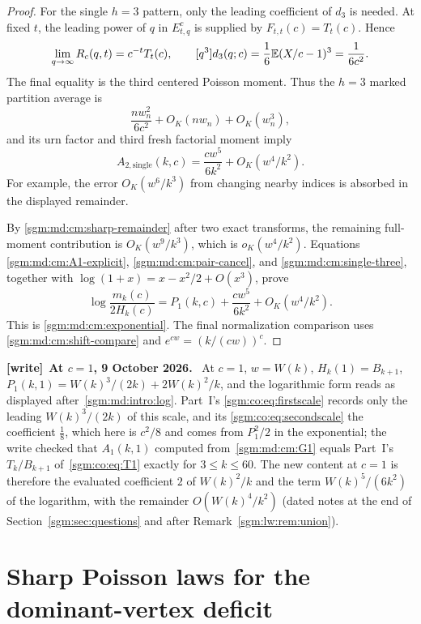 \documentclass[11pt,letterpaper]{article}
\theoremstyle{remark}\newtheorem{remark}[theorem]{Remark}
\newenvironment{writenote}[1][]{\par\smallskip\begingroup\small
 \noindent\textbf{[write]}\if\relax\detokenize{#1}\relax\else~\textbf{#1.}\fi\ }%
 {\par\endgroup\smallskip}
\theoremstyle{definition}\newtheorem{definition}[theorem]{Definition}
\begin{document}
\begin{proof}
For the single \(h=3\) pattern, only the leading coefficient of
\(d_3\) is needed. At fixed \(t\), the leading power of \(q\) in
\(E^c_{t,q}\) is supplied by \(F_{t,t}(c)=T_t(c)\).
Hence
\[
 \lim_{q\to\infty}R_c(q,t)=c^{-t}T_t(c),\qquad
 [q^3]d_3(q;c)
 =\frac16\mathbb E(X/c-1)^3=\frac1{6c^2}.
\]
The final equality is the third centered Poisson moment.
Thus the \(h=3\) marked partition average is
\[
 \frac{nw_n^2}{6c^2}+O_K(nw_n)+O_K(w_n^3),
\]
and its urn factor and third fresh factorial moment imply
\begin{equation}\label{sgm:md:cm:single-three}
 A_{2,\mathrm{single}}(k,c)
 =\frac{cw^5}{6k^2}+O_K(w^4/k^2).
\end{equation}
For example, the error \(O_K(w^6/k^3)\) from changing nearby
indices is absorbed in the displayed remainder.

By \eqref{sgm:md:cm:sharp-remainder} after two exact transforms, the
remaining full-moment contribution is \(O_K(w^9/k^3)\), which is
\(o_K(w^4/k^2)\). Equations
\eqref{sgm:md:cm:A1-explicit}, \eqref{sgm:md:cm:pair-cancel}, and
\eqref{sgm:md:cm:single-three}, together with
\(\log(1+x)=x-x^2/2+O(x^3)\), prove
\[
 \log\frac{m_k(c)}{2H_k(c)}
 =P_1(k,c)+\frac{cw^5}{6k^2}+O_K(w^4/k^2).
\]
This is \eqref{sgm:md:cm:exponential}. The final normalization comparison
uses \eqref{sgm:md:cm:shift-compare} and \(e^{cw}=(k/(cw))^c\).
\end{proof}
\begin{writenote}[At $c=1$, 9 October 2026]
At $c=1$, $w=W(k)$, $H_k(1)=B_{k+1}$, $P_1(k,1)=W(k)^3/(2k)+2W(k)^2/k$, and the
logarithmic form reads as displayed after~\eqref{sgm:md:intro:log}. Part~I's
\eqref{sgm:co:eq:firstscale} records only the leading $W(k)^3/(2k)$ of this
scale, and its \eqref{sgm:co:eq:secondscale} the coefficient $\frac18$, which
here is $c^2/8$ and comes from $P_1^2/2$ in the exponential; the write checked
that $A_1(k,1)$ computed from~\eqref{sgm:md:cm:G1} equals Part~I's
$T_k/B_{k+1}$ of~\eqref{sgm:co:eq:T1} exactly for $3\le k\le60$. The new
content at $c=1$ is therefore the evaluated coefficient $2$ of $W(k)^2/k$ and
the term $W(k)^5/(6k^2)$ of the logarithm, with the remainder
$O(W(k)^4/k^2)$ (dated notes at the end of Section~\ref{sgm:sec:questions} and
after Remark~\ref{sgm:lw:rem:union}).
\end{writenote}
\clearpage
\section{Sharp Poisson laws for the dominant-vertex deficit}
\label{sgm:md:dl:section}
\end{document}
